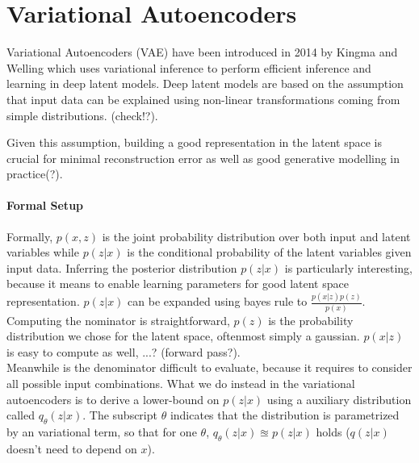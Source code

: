 \section{Variational Autoencoders}
\label{sec:vae}
Variational Autoencoders (VAE) have been introduced in 2014 by Kingma and Welling which uses variational inference to perform efficient inference and learning in deep latent models.
Deep latent models are based on the assumption that input data can be explained using non-linear transformations coming from simple distributions. \cite{rezende:2014} (check!?).

Given this assumption, building a good representation in the latent space is crucial for minimal reconstruction error as well as good generative modelling in practice(?).

\paragraph{Formal Setup}
Formally, $p(x,z)$ is the joint probability distribution over both input and latent variables while $p(z|x)$ is the conditional probability of the latent variables given input data.
Inferring the posterior distribution $p(z|x)$ is particularly interesting, because it means to enable learning parameters for good latent space representation.
$p(z|x)$ can be expanded using bayes rule to $\frac{p(x|z) p(z)}{p(x)}$.
Computing the nominator is straightforward, $p(z)$ is the probability distribution we chose for the latent space, oftenmost simply a gaussian.
$p(x|z)$ is easy to compute as well, ...? (forward pass?).\\
Meanwhile is the denominator difficult to evaluate, because it requires to consider all possible input combinations.
What we do instead in the variational autoencoders is to derive a lower-bound on $p(z|x)$ using a auxiliary distribution called $q_\theta(z|x)$. The subscript $\theta$ indicates that the distribution is parametrized by an variational term, so that for one $\theta$, $q_\theta(z|x) \approxeq p(z|x)$ holds ($q(z|x)$ doesn't need to depend on $x$).




